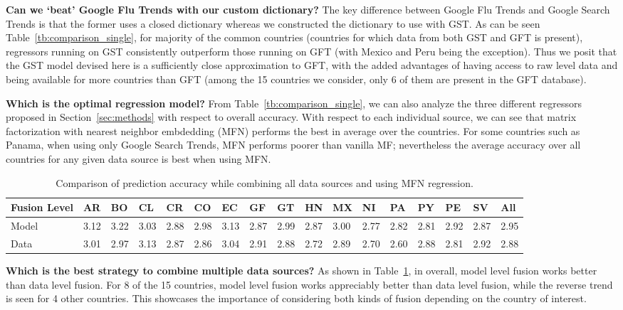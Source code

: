 {\noindent \textbf{Can we `beat' Google Flu Trends with our custom dictionary?}}  
The key difference between Google Flu Trends and Google Search Trends is that the former uses a closed dictionary whereas
we constructed the dictionary to use with GST.
As can be seen Table~\ref{tb:comparison_single},
for majority of the common countries (countries for which data from both GST and GFT
is present), regressors running on GST consistently 
outperform those running on GFT (with Mexico and Peru being the exception).
Thus we posit that the GST model devised here is a sufficiently close approximation to GFT, 
with the added advantages of having access to raw level data and being available for more countries 
than GFT (among the 15 countries we consider, only 6 of them are present in the GFT database).

{\noindent \textbf{Which is the optimal regression model?}} From Table~\ref{tb:comparison_single}, we can also
analyze the three different regressors proposed in Section~\ref{sec:methods} with respect to overall accuracy.
With respect to each individual source, we can see that matrix factorization with nearest 
neighbor embdedding (MFN) performs the best in average over the countries.
For some countries such as Panama, when using only Google Search Trends, MFN
performs poorer than vanilla MF; nevertheless the average accuracy over all countries for any given
data source is best when using MFN.

\begin{table}[tb!]
  \centering
  \caption{\label{tb:comparison_ensemble}Comparison of prediction accuracy while combining all data sources
  and using MFN regression.}
\vspace{1em}
  \begin{tabular}{|p{1.5cm}|*{16}{l|}}
\hline
Fusion Level& AR & BO & CL & CR & CO & EC & GF & GT & HN & MX & NI & PA & PY & PE & SV & All\\
\hline \hline
Model       &3.12&3.22&3.03&2.88&2.98&3.13&2.87&2.99&2.87&3.00&2.77&2.82&2.81&2.92&2.87&2.95\\ 
Data        &3.01&2.97&3.13&2.87&2.86&3.04&2.91&2.88&2.72&2.89&2.70&2.60&2.88&2.81&2.92&2.88\\ 
\hline
\end{tabular}
\end{table}

{\noindent \textbf{Which is the best strategy to combine
multiple data sources?}} 
As shown in Table~\ref{tb:comparison_ensemble}, in overall,
model level fusion works better than data level fusion.
For 8 of the 15 countries, model level fusion works
appreciably better than data level fusion, while the reverse trend is seen for 4 other countries. 
This showcases the importance of considering both kinds of fusion depending on the country of interest.


